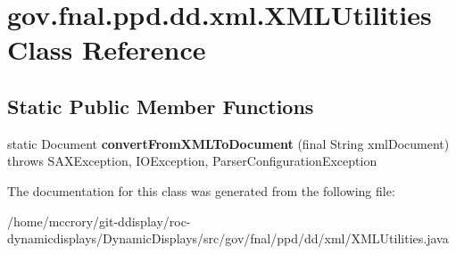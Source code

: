 \hypertarget{classgov_1_1fnal_1_1ppd_1_1dd_1_1xml_1_1XMLUtilities}{\section{gov.\-fnal.\-ppd.\-dd.\-xml.\-X\-M\-L\-Utilities Class Reference}
\label{classgov_1_1fnal_1_1ppd_1_1dd_1_1xml_1_1XMLUtilities}
}
\subsection*{Static Public Member Functions}
\begin{DoxyCompactItemize}
\item 
\hypertarget{classgov_1_1fnal_1_1ppd_1_1dd_1_1xml_1_1XMLUtilities_ad6763a56d39e5fae2858ee6761709052}{static Document {\bfseries convert\-From\-X\-M\-L\-To\-Document} (final String xml\-Document)  throws S\-A\-X\-Exception, I\-O\-Exception, Parser\-Configuration\-Exception }\label{classgov_1_1fnal_1_1ppd_1_1dd_1_1xml_1_1XMLUtilities_ad6763a56d39e5fae2858ee6761709052}

\end{DoxyCompactItemize}


The documentation for this class was generated from the following file\-:\begin{DoxyCompactItemize}
\item 
/home/mccrory/git-\/ddisplay/roc-\/dynamicdisplays/\-Dynamic\-Displays/src/gov/fnal/ppd/dd/xml/X\-M\-L\-Utilities.\-java\end{DoxyCompactItemize}
